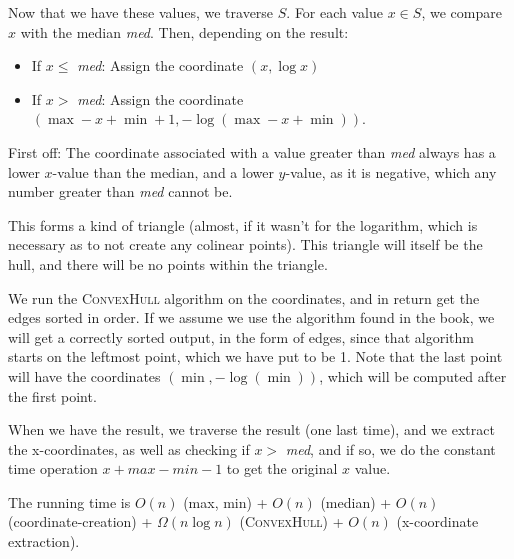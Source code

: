 Now that we have these values, we traverse $S$. For each value $x \in S$, we compare $x$ with the median \textit{med}. Then, depending on the result:
\begin{itemize}
	\item If $x \le $ \textit{med}: Assign the coordinate $(x,\log x)$
	\item If $x > $ \textit{med}: Assign the coordinate $(\max - x + \min + 1, - \log (\max - x + \min))$.
\end{itemize}
First off: The coordinate associated with a value greater than \textit{med} always has a lower $x$-value than the median, and a lower $y$-value, as it is negative, which any number greater than \textit{med} cannot be.

This forms a kind of triangle (almost, if it wasn't for the logarithm, which is necessary as to not create any colinear points). This triangle will itself be the hull, and there will be no points within the triangle.

We run the \textsc{ConvexHull} algorithm on the coordinates, and in return get the edges sorted in order. If we assume we use the algorithm found in the book, we will get a correctly sorted output, in the form of edges, since that algorithm starts on the leftmost point, which we have put to be 1. Note that the last point will have the coordinates $(\min, -\log(\min))$, which will be computed after the first point.

When we have the result, we traverse the result (one last time), and we extract the x-coordinates, as well as checking if $x > $ \textit{med}, and if so, we do the constant time operation $x + max - min - 1$ to get the original $x$ value.

The running time is $O(n)$ (max, min) + $O(n)$ (median) + $O(n)$ (coordinate-creation) + $\Omega (n \log n)$ (\textsc{ConvexHull}) + $O(n)$ (x-coordinate extraction).

